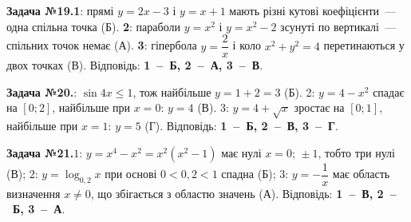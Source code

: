 \documentclass[12pt]{article}
\begin{document}
\par\vspace{0.3cm}\noindent\hypertarget{sol:19}{}
\begin{tcolorbox}[colback=titleBg!40, colframe=mainGreen!55, boxrule=0.4pt, arc=2pt, left=6pt, right=6pt, top=4pt, bottom=4pt, breakable]
\noindent\small\textbf{Задача №19.}\quad \textbf{1}: прямі $y=2x-3$ і $y=x+1$ мають різні кутові коефіцієнти~--- одна спільна точка (Б). \textbf{2}: параболи $y=x^2$ і $y=x^2-2$ зсунуті по вертикалі~--- спільних точок немає (А). \textbf{3}: гіпербола $y=\dfrac{2}{x}$ і коло $x^2+y^2=4$ перетинаються у двох точках (В). Відповідь: \textbf{1~--~Б, 2~--~А, 3~--~В}.
\par\vspace{0.1cm}\hfill\hyperlink{task:19}{}
\end{tcolorbox}
\par\vspace{0.3cm}\noindent\hypertarget{sol:20}{}
\begin{tcolorbox}[colback=titleBg!40, colframe=mainGreen!55, boxrule=0.4pt, arc=2pt, left=6pt, right=6pt, top=4pt, bottom=4pt, breakable]
\noindent\small\textbf{Задача №20.}: $\sin4x\leqslant1$, тож найбільше $y=1+2=3$ (Б). 2: $y=4-x^2$ спадає на $[0;2]$, найбільше при $x=0$: $y=4$ (В). 3: $y=4+\sqrt{x}$ зростає на $[0;1]$, найбільше при $x=1$: $y=5$ (Г). Відповідь: \textbf{1~--~Б, 2~--~В, 3~--~Г}.
\par\vspace{0.1cm}\hfill\hyperlink{task:20}{}
\end{tcolorbox}
\par\vspace{0.3cm}\noindent\hypertarget{sol:21}{}
\begin{tcolorbox}[colback=titleBg!40, colframe=mainGreen!55, boxrule=0.4pt, arc=2pt, left=6pt, right=6pt, top=4pt, bottom=4pt, breakable]
\noindent\small\textbf{Задача №21.}\quad $1$: $y=x^4-x^2=x^2(x^2-1)$ має нулі $x=0;\,\pm1$, тобто три нулі (В); $2$: $y=\log_{0{,}2}x$ при основі $0<0{,}2<1$ спадна (Б); $3$: $y=-\dfrac1x$ має область визначення $x\ne0$, що збігається з областю значень (А). Відповідь: \textbf{1~--~В, 2~--~Б, 3~--~А}.
\par\vspace{0.1cm}\hfill\hyperlink{task:21}{}
\end{tcolorbox}
\par\vspace{0.3cm}\noindent\hypertarget{sol:22}{}
\end{document}
